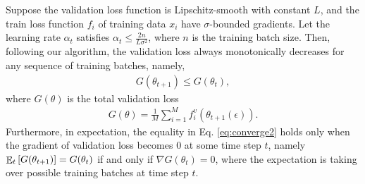 
Suppose the validation loss function is Lipschitz-smooth with constant $L$, and the train loss
function $f_i$ of training data $x_i$ have $\sigma$-bounded gradients. Let the learning rate
$\alpha_t$ satisfies $\alpha_t \leq \frac{2n}{L\sigma^2}$, where $n$ is the training batch size.
Then, following our algorithm, the validation loss always monotonically decreases for any sequence of
training batches, namely,
\begin{align}
\label{eq:converge2}
G(\theta_{t+1}) \leq G(\theta_{t}),
\end{align}
where $G(\theta)$ is the total validation loss
\begin{align}
G(\theta) = \frac{1}{M} \sum_{i=1}^M f^v_i(\theta_{t+1}(\epsilon)).
\end{align}
Furthermore, in expectation, the equality in Eq. \ref{eq:converge2} holds only when the gradient of
validation loss becomes 0 at some time step $t$, namely $\EEsub{G(\theta_{t+1})}{t} = G(\theta_t)$
if and only if $\nabla G(\theta_t) = 0$, where the expectation is taking over possible training
batches at time step $t$.

